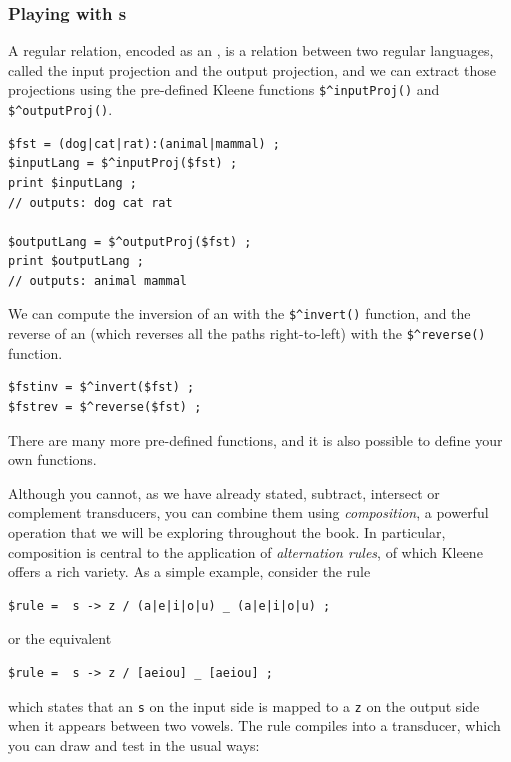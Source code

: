 \subsubsection{Playing with \fst{}s}

A regular relation, encoded as an \fst{}, is a relation between two regular languages,
called the input projection and the output projection, and we can extract those
projections using the pre-defined Kleene functions \verb!$^inputProj()!
and \verb!$^outputProj()!.


\begin{Verbatim}
$fst = (dog|cat|rat):(animal|mammal) ;
$inputLang = $^inputProj($fst) ;
print $inputLang ;
// outputs: dog cat rat

$outputLang = $^outputProj($fst) ;
print $outputLang ;
// outputs: animal mammal
\end{Verbatim}

We can compute the inversion of an \fst{} with the \verb!$^invert()!
function, and the reverse of an \fsm{} (which reverses all the paths right-to-left)
with the \verb!$^reverse()! function.


\begin{Verbatim}
$fstinv = $^invert($fst) ;
$fstrev = $^reverse($fst) ;
\end{Verbatim}

\noindent
There are many more pre-defined functions, and it is also possible to define your own functions.

Although you cannot, as we have already stated, subtract, intersect or complement
transducers, you can combine them using \emph{composition}, a powerful operation that we
will be exploring throughout the book.
In particular, composition is central to the application of \emph{alternation rules}, of
which Kleene offers a rich variety.  As a simple example, consider the rule

\begin{Verbatim}
$rule =  s -> z / (a|e|i|o|u) _ (a|e|i|o|u) ;
\end{Verbatim}

\noindent
or the equivalent

\begin{Verbatim}
$rule =  s -> z / [aeiou] _ [aeiou] ;
\end{Verbatim}

\noindent
which states that an \texttt{s} on the input side is mapped to a \texttt{z} on the output
side when it appears between two vowels.  The rule compiles into a transducer, which you can
draw and test in the usual ways:

